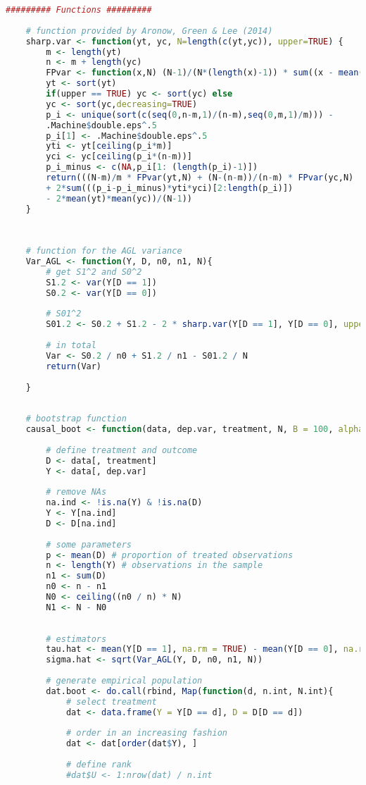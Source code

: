 \documentclass[aodsor,preprint]{imsart}
\numberwithin{equation}{section}
\theoremstyle{plain}
\begin{document}
\begin{lstlisting}[language=R, basicstyle=\tiny]
	######### Functions ######### 
		
	# function provided by Aronow, Green & Lee (2014)
	sharp.var <- function(yt, yc, N=length(c(yt,yc)), upper=TRUE) {
		m <- length(yt)
		n <- m + length(yc)
		FPvar <- function(x,N) (N-1)/(N*(length(x)-1)) * sum((x - mean(x))^2)
		yt <- sort(yt)
		if(upper == TRUE) yc <- sort(yc) else
		yc <- sort(yc,decreasing=TRUE)
		p_i <- unique(sort(c(seq(0,n-m,1)/(n-m),seq(0,m,1)/m))) -
		.Machine$double.eps^.5
		p_i[1] <- .Machine$double.eps^.5
		yti <- yt[ceiling(p_i*m)]
		yci <- yc[ceiling(p_i*(n-m))]
		p_i_minus <- c(NA,p_i[1: (length(p_i)-1)])
		return(((N-m)/m * FPvar(yt,N) + (N-(n-m))/(n-m) * FPvar(yc,N)
		+ 2*sum(((p_i-p_i_minus)*yti*yci)[2:length(p_i)])
		- 2*mean(yt)*mean(yc))/(N-1))
	}
	
	
	
	# function for the AGL variance
	Var_AGL <- function(Y, D, n0, n1, N){
		# get S1^2 and S0^2
		S1.2 <- var(Y[D == 1])
		S0.2 <- var(Y[D == 0])
		
		# S01^2
		S01.2 <- S0.2 + S1.2 - 2 * sharp.var(Y[D == 1], Y[D == 0], upper = TRUE)
		
		# in total
		Var <- S0.2 / n0 + S1.2 / n1 - S01.2 / N
		return(Var)
		
	}
	
	
	# bootstrap function
	causal_boot <- function(data, dep.var, treatment, N, B = 100, alpha = 0.05){
		
		# define treatment and outcome
		D <- data[, treatment]
		Y <- data[, dep.var]
		
		# remove NAs
		na.ind <- !is.na(Y) & !is.na(D)
		Y <- Y[na.ind]
		D <- D[na.ind]
		
		# some parameters
		p <- mean(D) # proportion of treated observations
		n <- length(Y) # observations in the sample
		n1 <- sum(D)
		n0 <- n - n1
		N0 <- ceiling((n0 / n) * N)
		N1 <- N - N0
		
		
		# estimators
		tau.hat <- mean(Y[D == 1], na.rm = TRUE) - mean(Y[D == 0], na.rm = TRUE)
		sigma.hat <- sqrt(Var_AGL(Y, D, n0, n1, N))
		
		# generate empirical population
		dat.boot <- do.call(rbind, Map(function(d, n.int, N.int){
			# select treatment
			dat <- data.frame(Y = Y[D == d], D = D[D == d])
			
			# order in an increasing fashion
			dat <- dat[order(dat$Y), ]
			
			# define rank
			#dat$U <- 1:nrow(dat) / n.int
			

\end{lstlisting}
\end{document}
